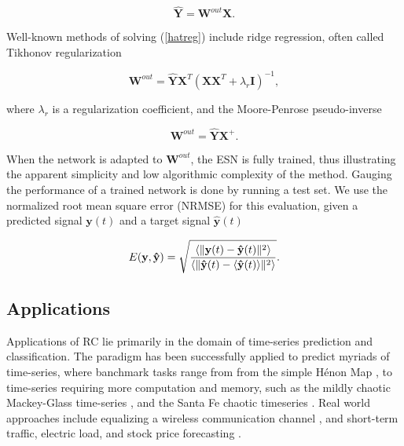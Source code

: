 \begin{equation}
  \mathbf{\hat{Y}} = \mathbf{W}^{out}\mathbf{X}.
  \label{hatreg}
\end{equation}

Well-known methods of solving (\ref{hatreg}) include ridge regression, often
called Tikhonov regularization

\begin{equation}
  \mathbf{W}^{out} = \mathbf{\hat{Y}}\mathbf{X}^{T}
                    (\mathbf{X}\mathbf{X}^{T} + \lambda_{r}\mathbf{I})^{-1},
  \label{tikhonov}
\end{equation}

\noindent where $\lambda_{r}$ is a regularization coefficient, and the
Moore-Penrose pseudo-inverse

\begin{equation}
  \mathbf{W}^{out} = \mathbf{\hat{Y}}\mathbf{X}^{+}.
  \label{pseudo}
\end{equation}

When the network is adapted to $\mathbf{W}^{out}$, the ESN is fully trained,
thus illustrating the apparent simplicity and low algorithmic complexity of the
method. Gauging the performance of a trained network is done by running a test
set. We use the normalized root mean square error (NRMSE) for this evaluation,
given a predicted signal $\mathbf{y}(t)$ and a target signal
$\mathbf{\hat{y}}(t)$

\begin{equation}
  E(\mathbf{y}, \mathbf{\hat{y}}) = \sqrt{\frac{
      \langle\Vert \mathbf{y}(t) - \mathbf{\hat{y}}(t) \Vert^{2}\rangle
    }{
      \langle\Vert \mathbf{\hat{y}}(t) - \langle\mathbf{\hat{y}}(t)\rangle \Vert^{2}\rangle
    }
  }
  .
  \label{nrmse}
\end{equation}


\subsection{Applications}

Applications of RC lie primarily in the domain of time-series prediction and
classification. The paradigm has been successfully applied to predict myriads of
time-series, where banchmark tasks range from from the simple H\'enon Map
\cite{goudarzi_comparative_2014}, to time-series requiring more computation and
memory, such as the mildly chaotic Mackey-Glass time-series
\cite{alippi_quantification_2009}, and the Santa Fe chaotic timeseries
\cite{rodan_minimum_2011}. Real world approaches include equalizing a wireless
communication channel \cite{jaeger_harnessing_2004}, and short-term traffic,
electric load, and stock price forecasting \cite{an_short-term_2011,
song_hourly_2011, lin_short-term_2009}.

